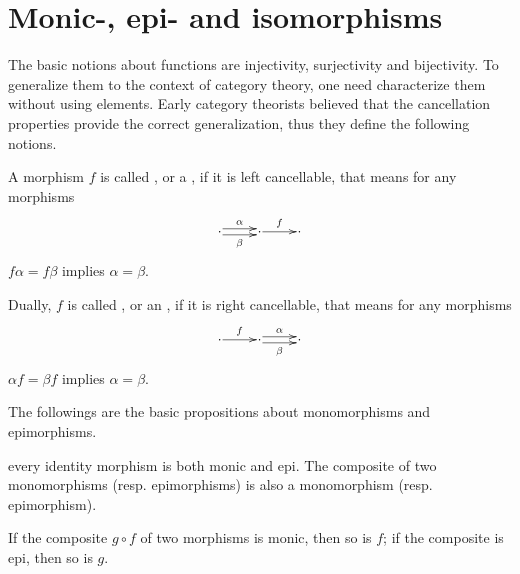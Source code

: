 \newpage\section{Monic-, epi- and isomorphisms}
The basic notions about functions are injectivity, surjectivity and bijectivity. To generalize them to the context of category theory, one need characterize them without using elements. Early category theorists believed that the cancellation properties provide the correct generalization, thus they define the following notions.
  \begin{defn}
    A morphism $f$ is called , or a , if it is left cancellable, that means
    for any morphisms
    \begin{displaymath}
    \xymatrix@1{\cdot\ar@<0.5ex>[r]^{\alpha}\ar@<-0.5ex>[r]_{\beta} &\cdot\ar[r]^{f} &\cdot}
    \end{displaymath}
    $f\alpha=f\beta$ implies $\alpha=\beta$.

    Dually, $f$ is called , or an , if it is right cancellable, that means for any morphisms
    \begin{displaymath}
    \xymatrix@1{\cdot\ar[r]^{f} &\cdot\ar@<0.5ex>[r]^{\alpha}\ar@<-0.5ex>[r]_{\beta} &\cdot}
    \end{displaymath}
    $\alpha f=\beta f$ implies $\alpha=\beta$.
  \end{defn}

  The followings are the basic propositions about monomorphisms and epimorphisms.
  \begin{prop}
    every identity morphism is both monic and epi. The composite of two monomorphisms (resp. epimorphisms) is also a monomorphism (resp. epimorphism).
  \end{prop}
  \begin{prop}\label{prop:triangle lemma}
    If the composite $g\circ f$ of two morphisms is monic, then so is $f$; if the composite is epi, then so is $g$.
  \end{prop}

